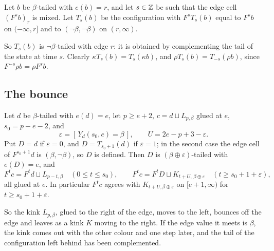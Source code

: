 \begin{definition}\label{c24:def:flip}
Let $b$ be $\beta$-tailed with $e(b)=r$, and let $s\in\mathbb{Z}$ be such that the edge cell $(F^sb)_r$ is mixed. Let $T_s(b)$ be the configuration with $F^sT_s(b)$ equal to $F^sb$ on $(-\infty,r]$ and to $(\neg\beta,\neg\beta)$ on $(r,\infty)$.
\end{definition}

So $T_s(b)$ is $\neg\beta$-tailed with edge $r$: it is obtained by complementing the tail of the state at time $s$. Clearly $\kappa T_s(b)=T_s(\kappa b)$, and $\rho T_s(b)=T_{-s}(\rho b)$, since $F^{-s}\rho b=\rho F^sb$.

\subsection{The bounce}\label{c24:sec:bounce}

\begin{lemma}[bounce]\label{c24:lem:bounce}
Let $d$ be $\beta$-tailed with $e(d)=e$, let $p\ge e+2$, $c=d\sqcup L_{p,\beta}$ glued at $e$, $s_0=p-e-2$, and
\[
\varepsilon=[\,Y_d(s_0,e)=\beta\,],\qquad U=2e-p+3-\varepsilon.
\]
Put $D=d$ if $\varepsilon=0$, and $D=T_{s_0+1}(d)$ if $\varepsilon=1$; in the second case the edge cell of $F^{s_0+1}d$ is $(\beta,\neg\beta)$, so $D$ is defined. Then $D$ is $(\beta\oplus\varepsilon)$-tailed with $e(D)=e$, and
\[
F^tc=F^td\sqcup L_{p-t,\beta}\quad(0\le t\le s_0),\qquad F^tc=F^tD\sqcup K_{t+U,\,\beta\oplus\varepsilon}\quad(t\ge s_0+1+\varepsilon),
\]
all glued at $e$. In particular $F^tc$ agrees with $K_{t+U,\beta\oplus\varepsilon}$ on $[e+1,\infty)$ for $t\ge s_0+1+\varepsilon$.
\end{lemma}

So the kink $L_{p,\beta}$, glued to the right of the edge, moves to the left, bounces off the edge and leaves as a kink $K$ moving to the right. If the edge value it meets is $\beta$, the kink comes out with the other colour and one step later, and the tail of the configuration left behind has been complemented.

